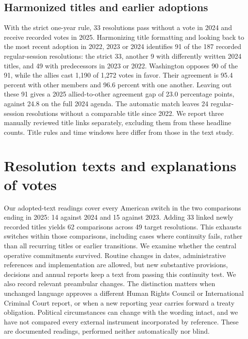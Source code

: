 \documentclass[10pt,authoryear]{elsarticle}
\begin{document}
\subsection{Harmonized titles and earlier adoptions}

With the strict one-year rule, 33 resolutions pass without a vote in 2024 and receive recorded votes in 2025. Harmonizing title formatting and looking back to the most recent adoption in 2022, 2023 or 2024 identifies 91 of the 187 recorded regular-session resolutions: the strict 33, another 9 with differently written 2024 titles, and 49 with predecessors in 2023 or 2022. Washington opposes 90 of the 91, while the allies cast 1,190 of 1,272 votes in favor. Their agreement is 95.4 percent with other members and 96.6 percent with one another. Leaving out these 91 gives a 2025 allied-to-other agreement gap of 23.0 percentage points, against 24.8 on the full 2024 agenda. The automatic match leaves 24 regular-session resolutions without a comparable title since 2022. We report three manually reviewed title links separately, excluding them from these headline counts. Title rules and time windows here differ from those in the text study.

\section{Resolution texts and explanations of votes}
\label{sec:content_review}

Our adopted-text readings cover every American switch in the two comparisons ending in 2025: 14 against 2024 and 15 against 2023. Adding 33 linked newly recorded titles yields 62 comparisons across 49 target resolutions. This exhausts switches within those comparisons, including cases where continuity fails, rather than all recurring titles or earlier transitions. We examine whether the central operative commitments survived. Routine changes in dates, administrative references and implementation are allowed, but new substantive provisions, decisions and annual reports keep a text from passing this continuity test. We also record relevant preambular changes. The distinction matters when unchanged language approves a different Human Rights Council or International Criminal Court report, or when a new reporting year carries forward a treaty obligation. Political circumstances can change with the wording intact, and we have not compared every external instrument incorporated by reference. These are documented readings, performed neither automatically nor blind.
\end{document}
